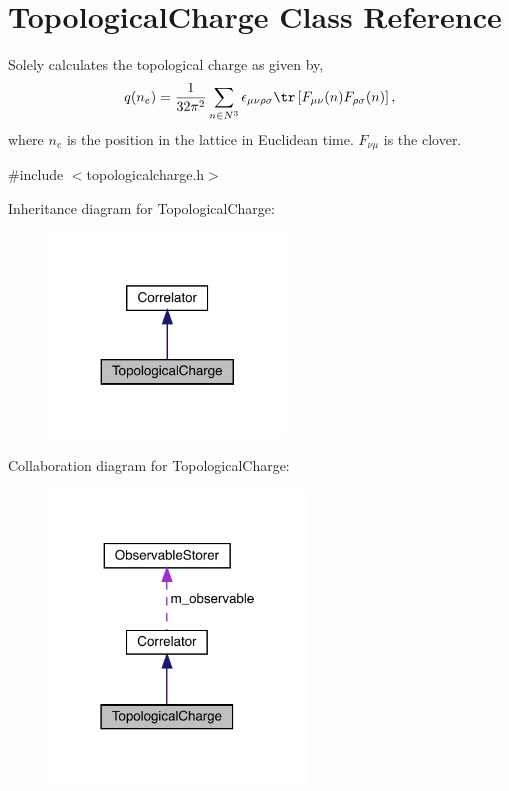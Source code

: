 \hypertarget{class_topological_charge}{}\section{Topological\+Charge Class Reference}
\label{class_topological_charge}


Solely calculates the topological charge as given by, \[ q(n_e) = \frac{1}{32\pi^2} \sum_{n\in N^3} \epsilon_{\mu\nu\rho\sigma} \tr\left[F_{\mu\nu}(n)F_{\rho\sigma}(n)\right], \] where $n_e$ is the position in the lattice in Euclidean time. $F_{\nu\mu}$ is the clover.  




{\ttfamily \#include $<$topologicalcharge.\+h$>$}



Inheritance diagram for Topological\+Charge\+:\nopagebreak
\begin{figure}[H]
\begin{center}
\leavevmode
\includegraphics[width=179pt]{class_topological_charge__inherit__graph}
\end{center}
\end{figure}


Collaboration diagram for Topological\+Charge\+:\nopagebreak
\begin{figure}[H]
\begin{center}
\leavevmode
\includegraphics[width=195pt]{class_topological_charge__coll__graph}
\end{center}
\end{figure}
